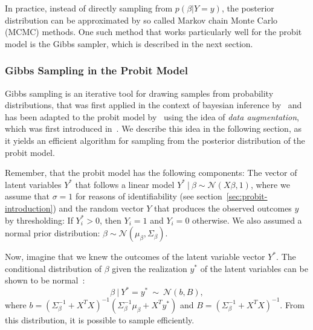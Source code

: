 In practice, instead of directly sampling from $p(\beta | Y=y)$,
the posterior distribution can be approximated by so called
Markov chain Monte Carlo (MCMC) methods.
One such method that works particularly well for the probit model
is the Gibbs sampler, which is described in the next section.

\subsubsection{Gibbs Sampling in the Probit Model}
\label{sec:gibbs}

Gibbs sampling is an iterative tool for drawing samples from
probability distributions, that was first applied in the
context of bayesian
inference by~\cite{gibbs-sampler} and has been adapted to the
probit model by~\cite{gibbs-probit-albert-chib} using the idea
of \textit{data augmentation}, which was first introduced
in~\cite{data-augmentation}.
We describe this idea in the following section, as it yields
an efficient algorithm for sampling from the posterior
distribution of the probit model.

Remember, that the probit model has the following components: The vector of latent
variables $Y^\ast$ that follows a linear model
$Y^\ast\ |\ \beta\sim \mathcal{N}(X \beta, 1)$, where we assume that $\sigma=1$
for reasons of identifiability (see section~\ref{sec:probit-introduction})
and the random vector $Y$ that produces the observed outcomes $y$ by
thresholding: If $Y_i^\ast > 0$, then $Y_i=1$ and $Y_i=0$ otherwise.
We also assumed a normal prior distribution:
$\beta \sim \mathcal{N}(\mu_\beta, \Sigma_\beta)$.

Now, imagine that we knew the outcomes of the latent variable vector $Y^\ast$.
The conditional distribution of $\beta$ given the realization $y^\ast$
of the latent variables can be shown to be normal~\cite{gibbs-probit-albert-chib}:
\begin{equation}
    \label{eq:gibbs-normal}
    \beta\ |\ Y^\ast = y^\ast\ \sim\ \mathcal{N}(b, B),
\end{equation}
where
$b = (\Sigma_\beta^{-1} + X^TX)^{-1}(\Sigma_\beta^{-1} \mu_\beta + X^T y^\ast)$
and
$B = (\Sigma_\beta^{-1} + X^TX)^{-1}$.
From this distribution, it is possible to sample efficiently.


